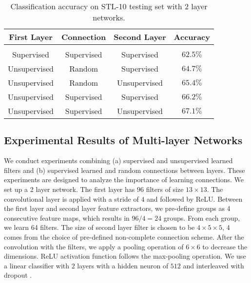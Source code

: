 \documentclass{article} \usepackage{iclr2016_workshop,times}
\begin{document}
\begin{table}[hbt!]
\caption{Classification accuracy on STL-10 testing set with 2 layer networks.}
\label{stl-experiment1}
\begin{center}
\begin{tabular}{cccc}
\multicolumn{1}{c}{\bf First Layer} &\multicolumn{1}{c}{\bf Connection} &\multicolumn{1}{c}{\bf Second Layer} &\multicolumn{1}{c}{\bf Accuracy}
\\ \hline \\
Supervised                  &Supervised               &Supervised             &$62.5\%$ \\
Unsupervised              &Random                   &Supervised             &$64.7\%$ \\
Unsupervised              &Random                   &Unsupervised         &$65.4\%$ \\
Unsupervised              &Supervised               &Supervised            &$66.2\%$ \\
Unsupervised              &Supervised               &Unsupervised        &$67.1\%$ \\

\end{tabular}
\end{center}
\end{table}

\subsection{Experimental Results of Multi-layer Networks}\label{sec:multilayers}




We conduct experiments combining (a) supervised and unsupervised learned filters and (b) supervised learned and random connections between layers. These experiments are designed to analyze the importance of learning connections. We set up a 2 layer network. The first layer has $96$ filters of size $13\times13$.
The convolutional layer is applied with a stride of $4$ and followed by ReLU.
Between the first layer and second layer feature extractors, we pre-define groups as 4 consecutive feature maps, which results in  $96/4=24$ groups.
From each group, we learn 64 filters. The size of second layer filter is chosen to be $4\times5\times5$, 4 comes from the choice of pre-defined non-complete connection scheme.
After the convolution with the filters, we apply a pooling operation of $6\times6$ to  decrease the dimensions. ReLU activation function follows the max-pooling operation.
We use a linear classifier with $2$ layers with a hidden neuron of $512$ and interleaved with dropout \citep{hinton2012improving}.
\end{document}
